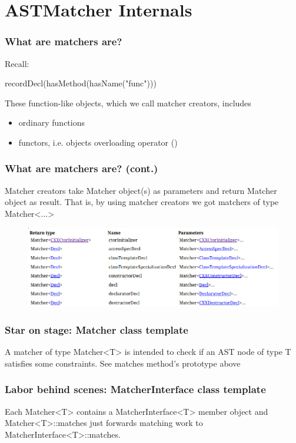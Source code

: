 \documentclass[]{beamer}
\begin{document}
\section{ASTMatcher Internals}
\frame{\tableofcontents[currentsection]}

\begin{frame}
  \frametitle{What are matchers are?}
  \begin{block}{Recall:}
    \centerline{recordDecl(hasMethod(hasName("func")))}
  \end{block}

  \pause
  \vspace{1em}
  These function-like objects, which we call \alert{matcher creators},
  includes
  \begin{itemize}
    \item ordinary functions
    \item functors, i.e. objects overloading operator ()
  \end{itemize}
\end{frame}

\begin{frame}
  \frametitle{What are matchers are? (cont.)}
  Matcher creators take \alert{Matcher} object(s) as parameters and return
  \alert{Matcher} object as result. 
  That is, by using matcher creators we got matchers of
  type \alert{Matcher<...>}
  \begin{figure}
    \includegraphics[width=\textwidth]{figures/matchers-prototype}
  \end{figure}
\end{frame}

\begin{frame}
  \frametitle{Star on stage: Matcher class template}
  
  \pause
  A matcher of type Matcher<T> is intended to check if an AST node of type
  T satisfies some constraints. See \alert{matches} method's prototype above
\end{frame}

\begin{frame}
  \frametitle{Labor behind scenes: MatcherInterface class template}
  
  \pause
  Each Matcher<T> contains a MatcherInterface<T> member object and
  Matcher<T>::matches just forwards matching work to
  MatcherInterface<T>::matches.
\end{frame}
\end{document}
